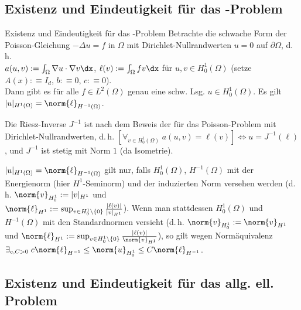 \pagebreak

\subsection{%
    Existenz und Eindeutigkeit für das -Problem%
}

\begin{Satz}{Existenz und Eindeutigkeit für das -Problem}
    Betrachte die schwache Form der Poisson-Gleichung $-\Delta u = f$ in $\Omega$
    mit Dirichlet-Nullrandwerten $u = 0$ auf $\partial\Omega$, d.\,h.\\
    $a(u, v) := \int_\Omega \nabla u \cdot \nabla v \dx$,
    $\ell(v) := \int_\Omega fv \dx$ für $u, v \in H^1_0(\Omega)$
    (setze $A(x) :\equiv I_d$, $b :\equiv 0$, $c :\equiv 0$).\\
    Dann gibt es für alle $f \in L^2(\Omega)$ genau eine schw. Lsg. $u \in H^1_0(\Omega)$.
    Es gilt $|u|_{H^1(\Omega)} = \norm{\ell}_{H^{-1}(\Omega)}$.
\end{Satz}

\begin{Bem}
    Die Riesz-Inverse $J^{-1}$ ist nach dem Beweis
    der  für das Poisson-Problem
    mit Dirichlet-Nullrandwerten, d.\,h.
    $[\forall_{v \in H^1_0(\Omega)}\; a(u, v) = \ell(v)] \iff u = J^{-1}(\ell)$, und
    $J^{-1}$ ist stetig mit Norm $1$ (da Isometrie).
\end{Bem}

\begin{Bem}
    $|u|_{H^1(\Omega)} = \norm{\ell}_{H^{-1}(\Omega)}$ gilt nur, falls
    $H^1_0(\Omega)$, $H^{-1}(\Omega)$ mit der Energienorm (hier $H^1$-Seminorm)
    und der induzierten Norm versehen werden
    (d.\,h. $\norm{v}_{H^1_0} := |v|_{H^1}$ und\\
    $\norm{\ell}_{H^1} := \sup_{v \in H^1_0 \setminus \{0\}}
    \frac{|\ell(v)|}{|v|_{H^1}}$).
    Wenn man stattdessen $H^1_0(\Omega)$ und $H^{-1}(\Omega)$ mit den Standardnormen versieht
    (d.\,h. $\norm{v}_{H^1_0} := \norm{v}_{H^1}$ und
    $\norm{\ell}_{H^1} := \sup_{v \in H^1_0 \setminus \{0\}}
    \frac{|\ell(v)|}{\norm{v}_{H^1}}$),
    so gilt wegen Normäquivalenz
    $\exists_{c, C > 0}\; c \norm{\ell}_{H^{-1}} \le \norm{u}_{H^1_0} \le C \norm{\ell}_{H^{-1}}$.
\end{Bem}

\subsection{%
    Existenz und Eindeutigkeit für das allg. ell. Problem%
}

